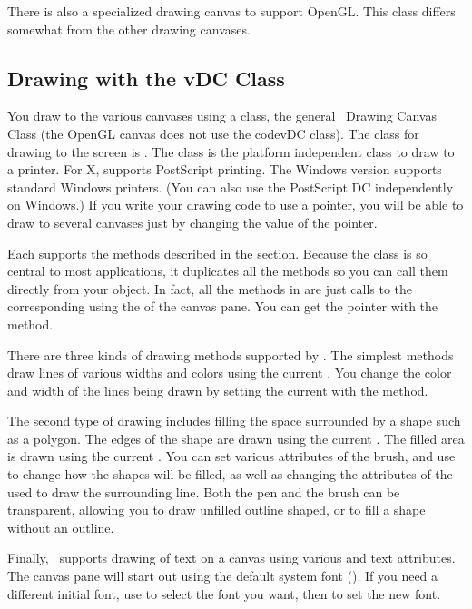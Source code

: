 There is also a specialized drawing canvas to support OpenGL. This
class differs somewhat from the other drawing canvases.

\subsection* {Drawing with the vDC Class}

You draw to the various canvases using a  class, the
general \V\ Drawing Canvas Class (the OpenGL canvas does not use
the code{vDC} class). The  class for drawing to the
screen is . The class  is the
platform independent class to draw to a printer. For X, 
supports PostScript printing. The Windows version supports
standard Windows printers. (You can also use the PostScript DC
independently on Windows.) If you write your drawing code to use
a  pointer, you will be able to draw to several
canvases just by changing the value of the pointer.

Each  supports the methods described in the  section.
Because the  class is so central to most
applications, it duplicates
all the  methods so you can call them directly from your
 object. In fact, all the methods in 
are just calls to the corresponding  using the 
of the canvas pane. You can get the  pointer with
the  method.

There are three kinds of drawing methods supported by \V\@. The simplest
methods draw lines of various widths and colors using the current
. You change the color and width of the lines being drawn
by setting the current  with the  method.

The second type of drawing includes filling the space surrounded
by a shape such as a polygon. The edges of the shape are drawn using
the current . The filled area is drawn using the current
. You can set various attributes of the brush, and use
 to change how the shapes will be filled, as well as
changing the attributes of the  used to draw the surrounding
line. Both the pen and the brush can be transparent, allowing you to
draw unfilled outline shaped, or to fill a shape without an outline.

Finally, \V\ supports drawing of text on a canvas using various
 and text attributes. The canvas pane will start out
using the default system font (). If you need
a different initial font, use  to
select the font you want, then  to set
the new font.

